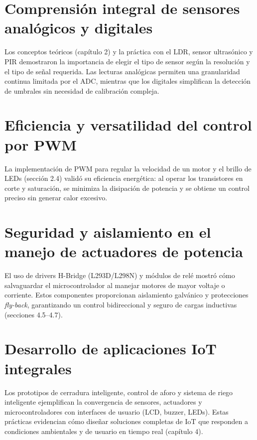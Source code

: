 

\section*{Comprensión integral de sensores analógicos y digitales}

Los conceptos teóricos (capítulo 2) y la práctica con el LDR, sensor ultrasónico y PIR demostraron la importancia de elegir el tipo de sensor según la resolución y el tipo de señal requerida. Las lecturas analógicas permiten una granularidad continua limitada por el ADC, mientras que los digitales simplifican la detección de umbrales sin necesidad de calibración compleja.

\section*{Eficiencia y versatilidad del control por PWM}

La implementación de PWM para regular la velocidad de un motor y el brillo de LEDs (sección 2.4) validó su eficiencia energética: al operar los transistores en corte y saturación, se minimiza la disipación de potencia y se obtiene un control preciso sin generar calor excesivo.

\section*{Seguridad y aislamiento en el manejo de actuadores de potencia}

El uso de drivers H-Bridge (L293D/L298N) y módulos de relé mostró cómo salvaguardar el microcontrolador al manejar motores de mayor voltaje o corriente. Estos componentes proporcionan aislamiento galvánico y protecciones \textit{fly-back}, garantizando un control bidireccional y seguro de cargas inductivas (secciones 4.5--4.7).

\section*{Desarrollo de aplicaciones IoT integrales}

Los prototipos de cerradura inteligente, control de aforo y sistema de riego inteligente ejemplifican la convergencia de sensores, actuadores y microcontroladores con interfaces de usuario (LCD, buzzer, LEDs). Estas prácticas evidencian cómo diseñar soluciones completas de IoT que responden a condiciones ambientales y de usuario en tiempo real (capítulo 4).

